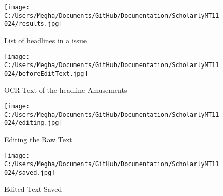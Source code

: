 \documentclass[amsart, 12pt]{article}
\begin{document}
\begin{figure}[H]
\centering
\texttt{[image: C:/Users/Megha/Documents/GitHub/Documentation/ScholarlyMT11024/results.jpg]}
\caption{List of headlines in a issue}
\label{fig:Phase 3}
\end{figure}


\begin{figure}[H]
\centering
\texttt{[image: C:/Users/Megha/Documents/GitHub/Documentation/ScholarlyMT11024/beforeEditText.jpg]}
\caption{OCR Text of the headline \textasciigrave Amusements\textasciiacute}
\label{fig:Phase 4}
\end{figure}

\begin{figure}[H]
\centering
\texttt{[image: C:/Users/Megha/Documents/GitHub/Documentation/ScholarlyMT11024/editing.jpg]}
\caption{Editing the Raw Text}
\label{fig:Phase 5}
\end{figure}

\begin{figure}[H]
\centering
\texttt{[image: C:/Users/Megha/Documents/GitHub/Documentation/ScholarlyMT11024/saved.jpg]}
\caption{Edited Text Saved}
\label{fig:Phase 6}
\end{figure}
\end{document}

